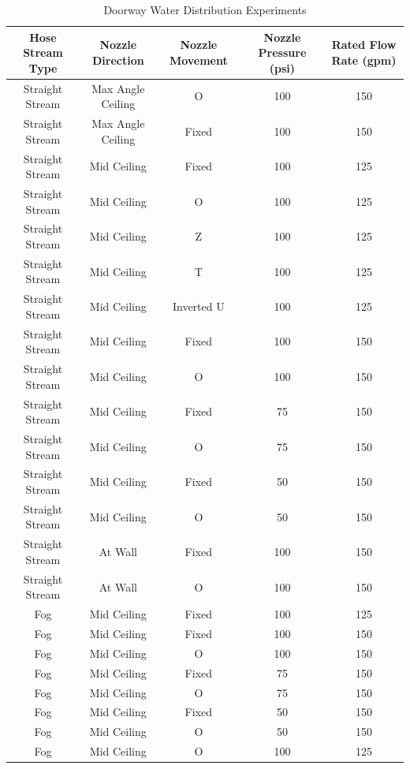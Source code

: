 \documentclass[12pt,oneside]{book}
\begin{document}
\begin{table}[!ht]
\centering
\small
\caption{Doorway Water Distribution Experiments}
\label{tab:Doorway_Fire_Attack_Distribution_Experiments}
\begin{tabular}{ccccc}
\toprule[1.5pt]
Hose Stream Type & Nozzle Direction & Nozzle Movement & Nozzle Pressure (psi) & Rated Flow Rate (gpm) \\ 
\midrule
Straight Stream   & Max Angle Ceiling   & O       & 100 & 150 \\
Straight Stream   & Max Angle Ceiling   & Fixed   & 100 & 150 \\
Straight Stream   & Mid Ceiling 		& Fixed   & 100 & 125 \\
Straight Stream   & Mid Ceiling 		& O       & 100 & 125 \\
Straight Stream   & Mid Ceiling 		& Z       & 100 & 125 \\
Straight Stream   & Mid Ceiling 		& T       & 100 & 125 \\
Straight Stream   & Mid Ceiling 		& Inverted U & 100 & 125 \\
Straight Stream   & Mid Ceiling 		& Fixed   & 100 & 150 \\
Straight Stream   & Mid Ceiling 		& O       & 100 & 150 \\
Straight Stream   & Mid Ceiling 		& Fixed   & 75 & 150 \\
Straight Stream   & Mid Ceiling 		& O & 75  & 150 \\
Straight Stream   & Mid Ceiling 		& Fixed   & 50 & 150 \\
Straight Stream   & Mid Ceiling 		& O & 50  & 150 \\
Straight Stream   & At Wall     		& Fixed   & 100 & 150 \\
Straight Stream   & At Wall     		& O       & 100 & 150 \\
Fog               & Mid Ceiling 		& Fixed   & 100 & 125 \\
Fog               & Mid Ceiling 		& Fixed   & 100 & 150 \\
Fog               & Mid Ceiling 		& O       & 100 & 150 \\
Fog               & Mid Ceiling 		& Fixed   & 75 & 150 \\
Fog               & Mid Ceiling 		& O & 75  & 150 \\
Fog               & Mid Ceiling 		& Fixed   & 50 & 150 \\
Fog               & Mid Ceiling 		& O & 50  & 150 \\
Fog               & Mid Ceiling 		& O       & 100 & 125 \\  

\end{tabular}
\end{table}
\end{document}
